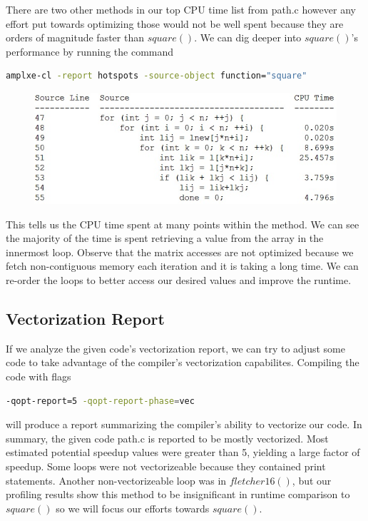 \documentclass[11pt]{article}
\begin{document}
There are two other methods in our top CPU time list from path.c however any effort put towards optimizing those would not be well spent because they are orders of magnitude faster than $square()$.\newline\newline
We can dig deeper into $square()$'s performance by running the command
\begin{lstlisting}[language=bash]
amplxe-cl -report hotspots -source-object function="square"
\end{lstlisting}
\begin{figure}[ht!]
\centering
\includegraphics{squareProfiled.jpg}
\end{figure}
This tells us the CPU time spent at many points within the method. We can see the majority of the time is spent retrieving a value from the array in the innermost loop. Observe that the matrix accesses are not optimized because we fetch non-contiguous memory each iteration and it is taking a long time. We can re-order the loops to better access our desired values and improve the runtime.\newline\newline

\subsection*{Vectorization Report}
If we analyze the given code's vectorization report, we can try to adjust some code to take advantage of the compiler's vectorization capabilites. Compiling the code with flags
\begin{lstlisting}[language=bash]
-qopt-report=5 -qopt-report-phase=vec
\end{lstlisting}
will produce a report summarizing the compiler's ability to vectorize our code. In summary, the given code path.c is reported to be mostly vectorized. Most estimated potential speedup values were greater than 5, yielding a large factor of speedup. Some loops were not vectorizeable because they contained print statements. Another non-vectorizeable loop was in $fletcher16()$, but our profiling results show this method to be insignificant in runtime comparison to $square()$ so we will focus our efforts towards $square()$.
\end{document}
